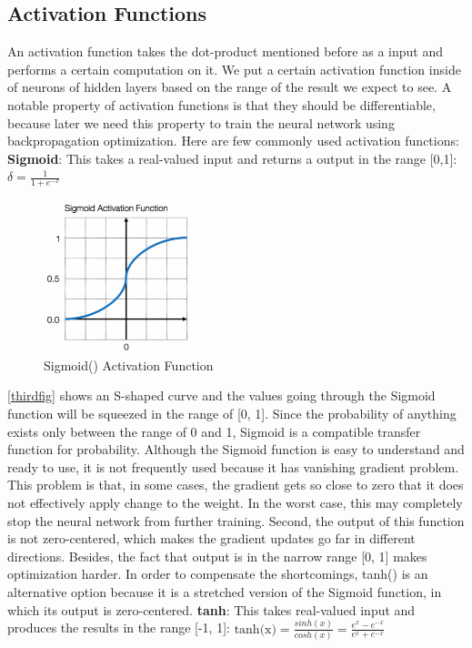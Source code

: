 \documentclass[a4paper,11pt,oneside]{book}
\begin{document}
\subsection{Activation Functions}
An activation function takes the dot-product mentioned before as a input and performs a certain computation on it. We put a certain activation function inside of neurons of hidden layers based on the range of
the result we expect to see. A notable property of activation functions is that they should
be differentiable, because later we need this property to train the neural network using backpropagation optimization.
\newline\newline
Here are few commonly used activation functions:\newline\newline
\textbf{Sigmoid}: This takes a real-valued input and returns a output in the range [0,1]:\newline\newline
$\delta = \frac{1}{1+e^{-x}}$
\begin{figure}[!h]
	\centering
	\includegraphics[width=0.4\textwidth]{figures/neuro}
	\caption{Sigmoid() Activation Function}
	\label{thirdfig}
\end{figure}

\autoref{thirdfig} shows an S-shaped curve and the values going
through the Sigmoid function will be squeezed in the range of [0, 1].
Since the probability of anything exists only between the range of 0 and
1, Sigmoid is a compatible transfer function for probability.
Although the Sigmoid function is easy to understand and ready
to use, it is not frequently used because it has vanishing gradient
problem. This problem is that, in some cases, the gradient gets so close to zero that it does not effectively apply change to the weight. In the
worst case, this may completely stop the neural network from further
training. Second, the output of this function is not zero-centered, which
makes the gradient updates go far in different directions. Besides, the
fact that output is in the narrow range [0, 1] makes optimization harder.
In order to compensate the shortcomings, tanh() is an alternative option
because it is a stretched version of the Sigmoid function, in which its
output is zero-centered. \newline\newline
\textbf{tanh}: This takes real-valued input and produces the results in the range [-1, 1]:\newline\newline
$\text{tanh(x)}=\frac{sinh(x)}{cosh(x)}=\frac{e^{x}-e^{-x}}{e^{x}+e^{-x}}$
\end{document}
